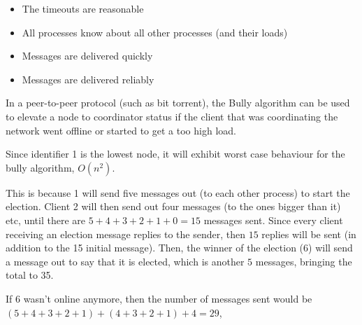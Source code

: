 \begin{itemize}
  \item The timeouts are reasonable
  \item All processes know about all other processes (and their loads)
  \item Messages are delivered quickly
  \item Messages are delivered reliably
\end{itemize}


In a peer-to-peer protocol (such as bit torrent), the Bully algorithm can be
used to elevate a node to coordinator status if the client that was coordinating
the network went offline or started to get a too high load.



Since identifier 1 is the lowest node, it will exhibit worst case behaviour for
the bully algorithm, $O(n^2)$.

This is because 1 will send five messages out (to each other process) to start
the election. Client 2 will then send out four messages (to the ones bigger than
it) etc, until there are $5 + 4 + 3 + 2 + 1 + 0 = 15$ messages sent. Since every
client receiving an election message replies to the sender, then $15$ replies
will be sent (in addition to the 15 initial message). Then, the winner of the
election (6) will send a message out to say that it is elected, which is another
$5$ messages, bringing the total to 35.


If 6 wasn't online anymore, then the number of messages sent would be $(5 + 4 +
3 + 2 + 1) + (4 + 3 + 2 + 1) + 4 = 29$,
